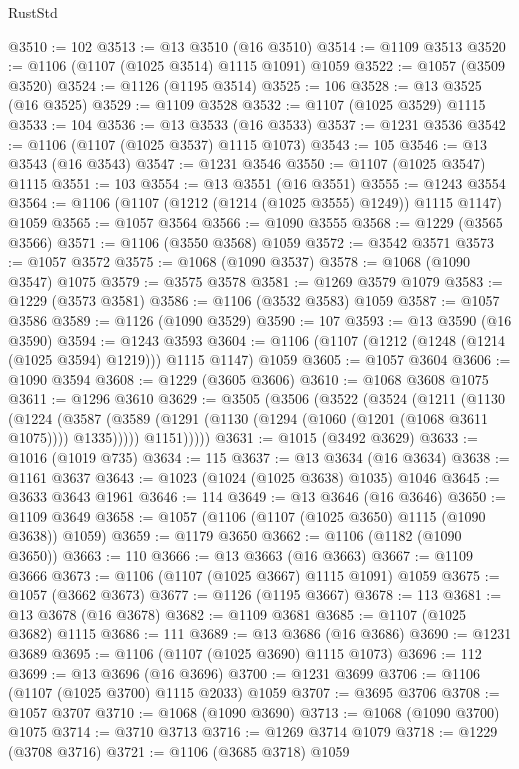 \begin{lexlean}{RustStd}
\begin{coremodule}
{\begin{coremodule}
{{{{{{{{{{{{{{{{{{{{{{{{{{{{{{{{{{{@3510 := 102
@3513 := @13 @3510 (@16 @3510)
@3514 := @1109 @3513
@3520 := @1106 (@1107 (@1025 @3514) @1115 @1091) @1059
@3522 := @1057 (@3509 @3520)
@3524 := @1126 (@1195 @3514)
@3525 := 106
@3528 := @13 @3525 (@16 @3525)
@3529 := @1109 @3528
@3532 := @1107 (@1025 @3529) @1115
@3533 := 104
@3536 := @13 @3533 (@16 @3533)
@3537 := @1231 @3536
@3542 := @1106 (@1107 (@1025 @3537) @1115 @1073)
@3543 := 105
@3546 := @13 @3543 (@16 @3543)
@3547 := @1231 @3546
@3550 := @1107 (@1025 @3547) @1115
@3551 := 103
@3554 := @13 @3551 (@16 @3551)
@3555 := @1243 @3554
@3564 := @1106 (@1107 (@1212 (@1214 (@1025 @3555) @1249)) @1115 @1147) @1059
@3565 := @1057 @3564
@3566 := @1090 @3555
@3568 := @1229 (@3565 @3566)
@3571 := @1106 (@3550 @3568) @1059
@3572 := @3542 @3571
@3573 := @1057 @3572
@3575 := @1068 (@1090 @3537)
@3578 := @1068 (@1090 @3547) @1075
@3579 := @3575 @3578
@3581 := @1269 @3579 @1079
@3583 := @1229 (@3573 @3581)
@3586 := @1106 (@3532 @3583) @1059
@3587 := @1057 @3586
@3589 := @1126 (@1090 @3529)
@3590 := 107
@3593 := @13 @3590 (@16 @3590)
@3594 := @1243 @3593
@3604 := @1106 (@1107 (@1212 (@1248 (@1214 (@1025 @3594) @1219))) @1115 @1147) @1059
@3605 := @1057 @3604
@3606 := @1090 @3594
@3608 := @1229 (@3605 @3606)
@3610 := @1068 @3608 @1075
@3611 := @1296 @3610
@3629 := @3505
    (@3506
      (@3522
        (@3524
          (@1211
            (@1130
              (@1224
                (@3587 (@3589 (@1291 (@1130 (@1294 (@1060 (@1201 (@1068 @3611 @1075)))) @1335)))))
              @1151)))))
@3631 := @1015 (@3492 @3629)
@3633 := @1016 (@1019 @735)
@3634 := 115
@3637 := @13 @3634 (@16 @3634)
@3638 := @1161 @3637
@3643 := @1023 (@1024 (@1025 @3638) @1035) @1046
@3645 := @3633 @3643 @1961
@3646 := 114
@3649 := @13 @3646 (@16 @3646)
@3650 := @1109 @3649
@3658 := @1057 (@1106 (@1107 (@1025 @3650) @1115 (@1090 @3638)) @1059)
@3659 := @1179 @3650
@3662 := @1106 (@1182 (@1090 @3650))
@3663 := 110
@3666 := @13 @3663 (@16 @3663)
@3667 := @1109 @3666
@3673 := @1106 (@1107 (@1025 @3667) @1115 @1091) @1059
@3675 := @1057 (@3662 @3673)
@3677 := @1126 (@1195 @3667)
@3678 := 113
@3681 := @13 @3678 (@16 @3678)
@3682 := @1109 @3681
@3685 := @1107 (@1025 @3682) @1115
@3686 := 111
@3689 := @13 @3686 (@16 @3686)
@3690 := @1231 @3689
@3695 := @1106 (@1107 (@1025 @3690) @1115 @1073)
@3696 := 112
@3699 := @13 @3696 (@16 @3696)
@3700 := @1231 @3699
@3706 := @1106 (@1107 (@1025 @3700) @1115 @2033) @1059
@3707 := @3695 @3706
@3708 := @1057 @3707
@3710 := @1068 (@1090 @3690)
@3713 := @1068 (@1090 @3700) @1075
@3714 := @3710 @3713
@3716 := @1269 @3714 @1079
@3718 := @1229 (@3708 @3716)
@3721 := @1106 (@3685 @3718) @1059
}}}}}}}}}}}}}}}}}}}}}}}}}}}}}}}}}}}
\end{coremodule}}
\end{coremodule}
\end{lexlean}
